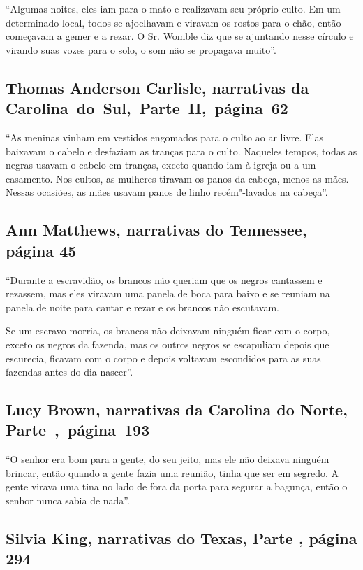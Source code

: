 ``Algumas noites, eles iam para o mato e realizavam seu próprio culto.
Em um determinado local, todos se ajoelhavam e viravam os rostos para o
chão, então começavam a gemer e a rezar. O Sr. Womble diz que se
ajuntando nesse círculo e virando suas vozes para o solo, o som não se
propagava muito''.

\subsection{Thomas Anderson Carlisle, narrativas da Carolina~do~Sul,~Parte~II,~página~62}

``As meninas vinham em vestidos engomados para o culto ao ar livre. Elas
baixavam o cabelo e desfaziam as tranças para o culto. Naqueles tempos,
todas as negras usavam o cabelo em tranças, exceto quando iam à igreja
ou a um casamento. Nos cultos, as mulheres tiravam os panos da cabeça,
menos as mães. Nessas ocasiões, as mães usavam panos de linho
recém"-lavados na cabeça''.

\subsection{Ann Matthews, narrativas do Tennessee, página 45}
\label{ref184}

``Durante a escravidão, os brancos não queriam que os negros cantassem e
rezassem, mas eles viravam uma panela de boca para baixo e se reuniam na
panela de noite para cantar e rezar e os brancos não escutavam.

Se um escravo morria, os brancos não deixavam ninguém ficar com o corpo,
exceto os negros da fazenda, mas os outros negros se escapuliam depois
que escurecia, ficavam com o corpo e depois voltavam escondidos para as
suas fazendas antes do dia nascer''.

\subsection{Lucy Brown, narrativas da Carolina do Norte, Parte~,~página~193} \label{ref38}

``O senhor era bom para a gente, do seu jeito, mas ele não deixava
ninguém brincar, então quando a gente fazia uma reunião, tinha que ser
em segredo. A gente virava uma tina no lado de fora da porta para
segurar a bagunça, então o senhor nunca sabia de nada''.

\subsection{Silvia King, narrativas do Texas, Parte , página 294}
\label{ref166}

